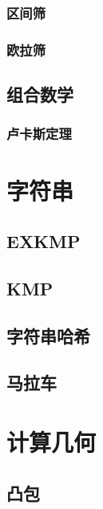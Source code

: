 \documentclass{article}
\begin{document}
\begin{multicols*}{3}
\subsubsection{区间筛}


\subsubsection{欧拉筛}


\subsection{组合数学}
\subsubsection{卢卡斯定理}


\section{字符串}
\subsection{EXKMP}


\subsection{KMP}


\subsection{字符串哈希}


\subsection{马拉车}


\section{计算几何}
\subsection{凸包}



\end{multicols*}
\end{document}
